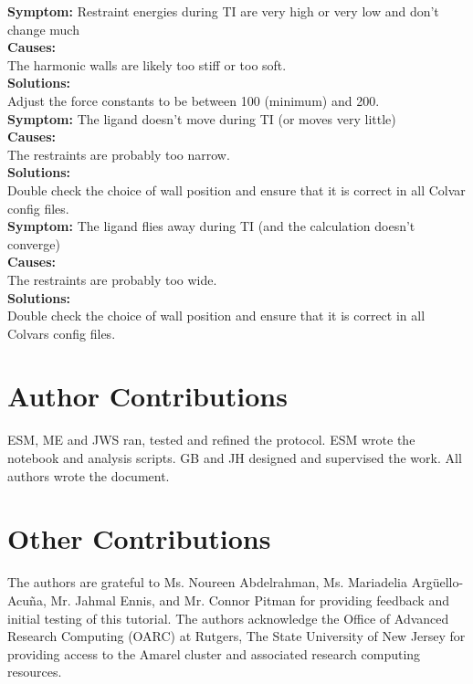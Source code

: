 \documentclass[9pt,tutorial]{Styling/livecoms}
\begin{document}
\noindent\textbf{Symptom:} Restraint energies during TI are very high or very low and don't change much\\
\textbf{Causes:}\\
The harmonic walls are likely too stiff or too soft.\\
\textbf{Solutions:}\\
Adjust the force constants to be between 100 (minimum) and 200. \\

\noindent\textbf{Symptom:} The ligand doesn't move during TI (or moves very little)\\
\textbf{Causes:}\\
The restraints are probably too narrow.\\
\textbf{Solutions:}\\
Double check the choice of wall position and ensure that it is correct in all Colvar config files.\\

\noindent\textbf{Symptom:} The ligand flies away during TI (and the calculation doesn't converge)\\
\textbf{Causes:}\\
The restraints are probably too wide.\\
\textbf{Solutions:}\\
Double check the choice of wall position and ensure that it is correct in all Colvars config files.\\



\setcounter{section}{3}
\renewcommand\thesection{\arabic{section}}
\section{Author Contributions}
ESM, ME and JWS ran, tested and refined the protocol.
ESM wrote the notebook and analysis scripts.
GB and JH designed and supervised the work.
All authors wrote the document.

\section{Other Contributions}
The authors are grateful to 
Ms. Noureen Abdelrahman, 
Ms. Mariadelia Arg\"uello-Acu\~na,
Mr. Jahmal Ennis, 
and
Mr. Connor Pitman for providing feedback and initial testing of this tutorial. The authors acknowledge the Office of Advanced Research Computing (OARC) at Rutgers, The State University of New Jersey for providing access to the Amarel cluster and associated research computing resources. 
\end{document}
